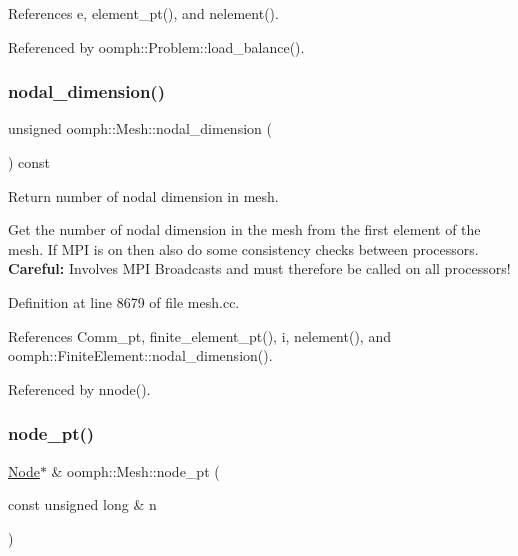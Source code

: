 References e, element\+\_\+pt(), and nelement().



Referenced by oomph\+::\+Problem\+::load\+\_\+balance().

\mbox{\label{classoomph_1_1Mesh_a32c8d3d454d3ba912b04985cb63e6a3c}} 
\subsubsection{\texorpdfstring{nodal\+\_\+dimension()}{nodal\_dimension()}}
{\footnotesize\ttfamily unsigned oomph\+::\+Mesh\+::nodal\+\_\+dimension (\begin{DoxyParamCaption}{ }\end{DoxyParamCaption}) const}



Return number of nodal dimension in mesh. 

Get the number of nodal dimension in the mesh from the first element of the mesh. If M\+PI is on then also do some consistency checks between processors. {\bfseries Careful\+:} Involves M\+PI Broadcasts and must therefore be called on all processors! 

Definition at line 8679 of file mesh.\+cc.



References Comm\+\_\+pt, finite\+\_\+element\+\_\+pt(), i, nelement(), and oomph\+::\+Finite\+Element\+::nodal\+\_\+dimension().



Referenced by nnode().

\mbox{\label{classoomph_1_1Mesh_aebdb699466fe07f2e27aa4404008cde4}} 
\subsubsection{\texorpdfstring{node\+\_\+pt()}{node\_pt()}\hspace{0.1cm}{\footnotesize\ttfamily [1/2]}}
{\footnotesize\ttfamily \hyperlink{classoomph_1_1Node}{Node}$\ast$ \& oomph\+::\+Mesh\+::node\+\_\+pt (\begin{DoxyParamCaption}\item[{const unsigned long \&}]{n }\end{DoxyParamCaption})\hspace{0.3cm}{\ttfamily [inline]}}



